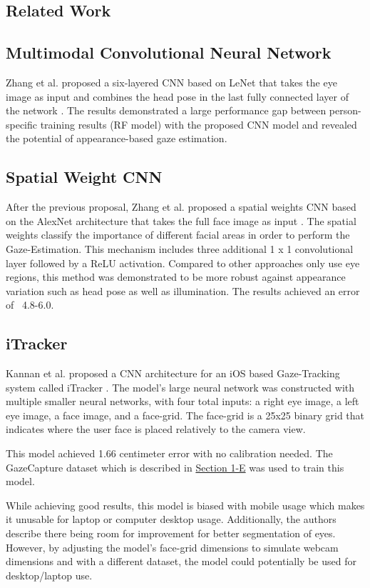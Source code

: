 \documentclass[letterpaper, 10 pt, conference]{ieeeconf}
\begin{document}
\subsection{Related Work}


\subsection*{Multimodal Convolutional Neural Network}
Zhang et al. proposed a six-layered CNN based on LeNet that takes the eye image as input and combines the head pose in the last fully connected layer of the network \cite{GazeEstimationInTheWild}. The results demonstrated a large performance gap between person-specific training results (RF model) with the proposed CNN model and revealed the potential of appearance-based gaze estimation.

\subsection*{Spatial Weight CNN}
After the previous proposal, Zhang et al. proposed a spatial weights CNN based on the AlexNet architecture \cite{alex_net} that takes the full face image as input \cite{written_all_over_your_face}. The spatial weights classify the importance of different facial areas in order to perform the Gaze-Estimation. This mechanism includes three additional 1 x 1 convolutional layer followed by a ReLU activation. Compared to other approaches only use eye regions, this method was demonstrated to be more robust against appearance variation such as head pose as well as illumination. The results achieved an error of ~4.8-6.0\degree.

\subsection*{iTracker}
Kannan et al. proposed a CNN architecture for an iOS based Gaze-Tracking system called iTracker \cite{iTracker}. The model's large neural network was constructed with multiple smaller neural networks, with four total inputs: a right eye image, a left eye image, a face image, and a face-grid. The face-grid is a 25x25 binary grid that indicates where the user face is placed relatively to the camera view. 

This model achieved 1.66 centimeter error with no calibration needed. The GazeCapture dataset which is described in \hyperref[state-art-datasets]{Section 1-E} was used to train this model.

While achieving good results, this model is biased with mobile usage which makes it unusable for laptop or computer desktop usage. Additionally, the authors describe there being room for improvement for better segmentation of eyes. However, by adjusting the model's face-grid dimensions to simulate webcam dimensions and with a different dataset, the model could potentially be used for desktop/laptop use.
\end{document}
